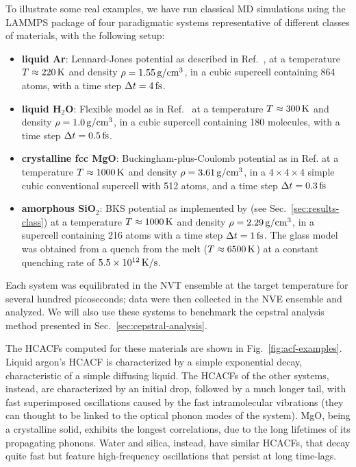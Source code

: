 \begin{LEtext}
To illustrate some real examples, we have run classical MD simulations using the \textsc{LAMMPS} package \cite{LAMMPS1995} of four paradigmatic systems representative of different classes of materials, with the following setup:
\begin{itemize}
    \item \textbf{liquid Ar}: Lennard-Jones potential as described in Ref.~\cite{Argon-FF}, at a temperature $T\approx 220\,\mathrm{K}$ and density $\rho=1.55\,\mathrm{g/cm^3}$, in a cubic supercell containing 864 atoms, with a time step $\Delta t=4\,\mathrm{fs}$.
    \item \textbf{liquid H$_2$O}: Flexible model as in Ref.~\cite{Water-FF} at a temperature $T\approx 300\,\mathrm{K}$ and density $\rho=1.0\,\mathrm{g/cm^3}$, in a cubic supercell containing 180 molecules, with a time step $\Delta t=0.5\,\mathrm{fs}$.
    \item \textbf{crystalline fcc MgO}: Buckingham-plus-Coulomb potential as in Ref. \cite{MgO-FF} at a temperature $T\approx 1000\,\mathrm{K}$ and density $\rho=3.61\,\mathrm{g/cm^3}$, in a $4\times 4\times 4$ simple cubic conventional supercell with 512 atoms, and a time step $\Delta t=0.3\,\mathrm{fs}$
    \item \textbf{amorphous SiO$_2$}: BKS potential \cite{Silica-BKS-1990} as implemented by \citet{Mantisi2012} (see Sec.~\ref{sec:results-class}) at a temperature $T\approx 1000\,\mathrm{K}$ and density $\rho=2.29\,\mathrm{g/cm^3}$,  in a supercell containing 216 atoms with a time step $\Delta t=1\,\mathrm{fs}$. The glass model was obtained from a quench from the melt ($T\approx 6500\,\mathrm{K}$) at a constant quenching rate of $5.5\times 10^{12}\,\mathrm{K/s}$.
\end{itemize}
Each system was equilibrated in the NVT ensemble at the target temperature for several hundred picoseconds; data were then collected in the NVE ensemble and analyzed. 
We will also use these systems to benchmark the cepstral analysis method presented in Sec.~\ref{sec:cepstral-analysis}. 

The HCACFs computed for these materials are shown in Fig.~\ref{fig:acf-examples}. 
Liquid argon's HCACF is characterized by a simple exponential decay, characteristic of a simple diffusing liquid. The HCACFs of the other systems, instead, are characterized by an initial drop, followed by a much longer tail, with fast superimposed oscillations caused by the fast intramolecular vibrations (they can thought to be linked to the optical phonon modes of the system). MgO, being a crystalline solid, exhibits the longest correlations, due to the long lifetimes of its propagating phonons. Water and silica, instead, have similar HCACFs, that decay quite fast but feature high-frequency oscillations that persist at long time-lags.


\end{LEtext}
